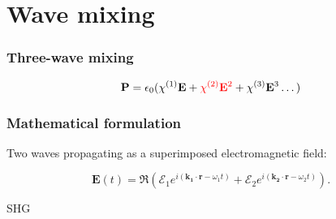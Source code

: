 \section{Wave mixing} 

\begin{frame}
  \frametitle{Three-wave mixing}
  \[
  \mathbf P = \epsilon_0 ( \chi^{\textup{(1)}} \mathbf E +
  \textcolor{red}{\chi^{\textup{(2)}} \mathbf E^2} + \chi^{\textup{(3)}} \mathbf E^3 \dots )
  \]

\end{frame}

\begin{frame}
  \frametitle{Mathematical formulation}

Two waves propagating as a superimposed electromagnetic field: 

    \[
    \mathbf{\mathbf{E}}(t) = \Re\left(\mathcal{E}_1e^{i(\mathbf{k_1} \cdot \mathbf{r} - \omega_1 t)}+\mathcal{E}_2e^{i(\mathbf{k_2} \cdot \mathbf{r} - \omega_2 t)} \right).
    \]

    \color{green} SHG


\end{frame}

